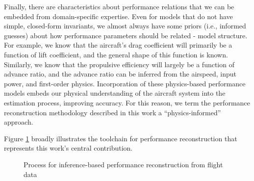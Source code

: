 \documentclass[conf]{new-aiaa}
\begin{document}
    Finally, there are characteristics about performance relations that we can be embedded from domain-specific expertise. Even for models that do not have simple, closed-form invariants, we almost always have some priors (i.e., informed guesses) about how performance parameters should be related - model structure. For example, we know that the aircraft's drag coefficient will primarily be a function of lift coefficient, and the general shape of this function is known. Similarly, we know that the propulsive efficiency will largely be a function of advance ratio, and the advance ratio can be inferred from the airspeed, input power, and first-order physics. Incorporation of these physics-based performance models embeds our physical understanding of the aircraft system into the estimation process, improving accuracy. For this reason, we term the performance reconstruction methodology described in this work a ``physics-informed'' approach.

    Figure \ref{fig:overall_procedure} broadly illustrates the toolchain for performance reconstruction that represents this work's central contribution.

    \begin{figure}[!htb]
        \centering
        \caption{Process for inference-based performance reconstruction from flight data}
        \label{fig:overall_procedure}
    \end{figure}
\end{document}
